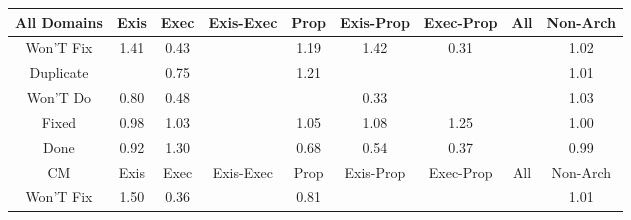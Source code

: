 \begin{tabular}{|c||c|c|c|c|c|c|c|c|}
\hline
All Domains & Exis & Exec & Exis-Exec & Prop & Exis-Prop & Exec-Prop & All & Non-Arch \\ 
\hline
Won'T Fix & \cellcolor[rgb]{0.8588326175758545,0.8157628188517205,0.42} 1.41 & \cellcolor[rgb]{0.8043905582393382,0.34011530899953457,0.3214311876900491} 0.43 &  & \cellcolor[rgb]{0.8857495470481117,0.8285129433385792,0.42} 1.19 & \cellcolor[rgb]{0.8568293214343794,0.8148138891004955,0.42} 1.42 & \cellcolor[rgb]{0.7821026116743833,0.23461902859208097,0.30062910422942446} 0.31 &  & \cellcolor[rgb]{0.907040428220222,0.8385980975779999,0.42} 1.02 \\ 
\hline
Duplicate &  & \cellcolor[rgb]{0.8636078737878402,0.6204106025957766,0.3767006822019841} 0.75 &  & \cellcolor[rgb]{0.8842784620132723,0.8278161135852342,0.42} 1.21 &  &  &  & \cellcolor[rgb]{0.9086304685232857,0.8393512745636615,0.42} 1.01 \\ 
\hline
Won'T Do & \cellcolor[rgb]{0.8723460438376834,0.661771274165035,0.3848563075818379} 0.80 & \cellcolor[rgb]{0.8133756660722212,0.3826448194085138,0.3298172883340732} 0.48 &  &  & \cellcolor[rgb]{0.7845036363253878,0.2459838786068353,0.3028700605703619} 0.33 &  &  & \cellcolor[rgb]{0.906631401611755,0.8384043481318839,0.42} 1.03 \\ 
\hline
Fixed & \cellcolor[rgb]{0.9057642097257648,0.8199505927019528,0.41604659574404707} 0.98 & \cellcolor[rgb]{0.9061404338785517,0.8381717844687876,0.42} 1.03 &  & \cellcolor[rgb]{0.9035137905876359,0.8369275850151959,0.42} 1.05 & \cellcolor[rgb]{0.9004925588729127,0.8354964752555902,0.42} 1.08 & \cellcolor[rgb]{0.8782553547586565,0.8249630627804162,0.42} 1.25 &  & \cellcolor[rgb]{0.9097039873810291,0.8385988736035374,0.4197237215556271} 1.00 \\ 
\hline
Done & \cellcolor[rgb]{0.895869705739532,0.7731166071671178,0.40681172535689647} 0.92 & \cellcolor[rgb]{0.8728957309493937,0.8224242936076075,0.42} 1.30 &  & \cellcolor[rgb]{0.8512873373156205,0.5620933966272699,0.3652015148279124} 0.68 & \cellcolor[rgb]{0.8242051169857099,0.4339042203990263,0.33992477585332914} 0.54 & \cellcolor[rgb]{0.792604847799174,0.28432961291609005,0.310431191279229} 0.37 &  & \cellcolor[rgb]{0.9077539698741307,0.8293687907375518,0.4179037052158553} 0.99 \\ 
\hline
\hline
CM & Exis & Exec & Exis-Exec & Prop & Exis-Prop & Exec-Prop & All & Non-Arch \\ 
\hline
Won'T Fix & \cellcolor[rgb]{0.8469029130182159,0.8101119061665233,0.42} 1.50 & \cellcolor[rgb]{0.7913622192465634,0.2784478377670664,0.3092714046301258} 0.36 &  & \cellcolor[rgb]{0.873859670353339,0.6689357730058043,0.3862690256631163} 0.81 &  &  &  & \cellcolor[rgb]{0.9083781239761658,0.8392317429360785,0.42} 1.01 \\ 

\end{tabular}
